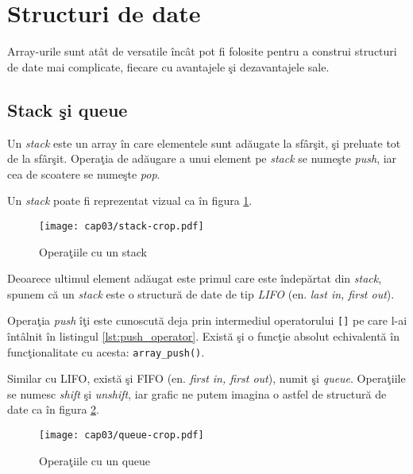 




\section{Structuri de date}
Array-urile sunt atât de versatile încât pot fi folosite
pentru a construi structuri de date mai complicate, fiecare
cu avantajele şi dezavantajele sale.

\subsection{Stack şi queue}
Un \textsl{stack} este un array în care elementele sunt adăugate la sfârşit,
şi preluate tot de la sfârşit. Operaţia de adăugare a unui element
pe \textit{stack} se numeşte \textsl{push}, iar cea de scoatere se numeşte \textsl{pop}.

Un \textit{stack} poate fi reprezentat vizual ca în figura \ref{fig:stack}.

\begin{figure}[ht!]
  \centering
    \texttt{[image: cap03/stack-crop.pdf]}
  \caption{Operaţiile cu un stack}
  \label{fig:stack}
\end{figure}

Deoarece ultimul element adăugat este primul care este îndepărtat
din \textit{stack}, spunem că un \textit{stack} este o structură de date
de tip \textsl{LIFO} (en. \textsl{last in, first out}).

Operaţia \textit{push} îţi este cunoscută deja prin intermediul
operatorului \texttt{[]} pe care l-ai întâlnit în
listingul \ref{lst:push_operator}. Există şi o funcţie
absolut echivalentă în funcţionalitate cu acesta: \texttt{array\_push()}.

Similar cu LIFO, există şi FIFO (en. \textsl{first in, first out}),
numit şi \textsl{queue}. Operaţiile se numesc \textsl{shift} şi \textsl{unshift},
iar grafic ne putem imagina o astfel de structură de date ca în
figura \ref{fig:queue}.

\begin{figure}[ht!]
  \centering
    \texttt{[image: cap03/queue-crop.pdf]}
  \caption{Operaţiile cu un queue}
  \label{fig:queue}
\end{figure}


